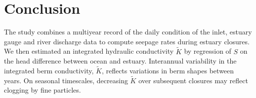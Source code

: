 \documentclass[preprint,12pt,authoryear]{elsarticle}
\begin{document}

\section{Conclusion}

The study combines a multiyear record of the daily condition of the inlet, estuary gauge and river discharge data to compute seepage rates during estuary closures.
We then estimated an integrated hydraulic conductivity $\tilde K$ by regression of $S$ on the head difference between ocean and estuary.
Interannual variability in the integrated berm conductivity, $\tilde K$, reflects variations in berm shapes between years. 
On seasonal timescales, decreasing $\tilde K$ over subsequent closures may reflect clogging by fine particles.


 
  
 
\end{document}
